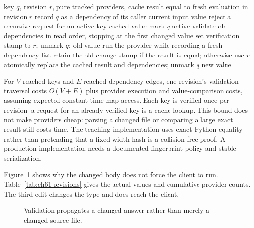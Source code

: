 \begin{algorithm}[htbp]
\caption{Demand a query in the current immutable revision.}
\label{alg:ch61-query}
\begin{pseudocode}
\Require key $q$, revision $r$, pure tracked providers, cache
\Ensure result equal to fresh evaluation in revision $r$
\State record $q$ as a dependency of its caller
  \State \Return current input value
\EndIf
\State reject a recursive request for an active key
  \State \Return cached value
\EndIf
\State mark $q$ active
  \State validate old dependencies in read order, stopping at the first changed value
    \State set verification stamp to $r$; unmark $q$; \Return old value
  \EndIf
\EndIf
\State run the provider while recording a fresh dependency list
\State retain the old change stamp if the result is equal; otherwise use $r$
\State atomically replace the cached result and dependencies; unmark $q$
\State \Return new value
\end{pseudocode}
\end{algorithm}

For $V$ reached keys and $E$ reached dependency edges, one revision's validation traversal costs $O(V+E)$ plus provider execution and value-comparison costs, assuming expected constant-time map access.
Each key is verified once per revision; a request for an already verified key is a cache lookup.
This bound does not make providers cheap: parsing a changed file or comparing a large exact result still costs time.
The teaching implementation uses exact Python equality rather than pretending that a fixed-width hash is a collision-free proof.
A production implementation needs a documented fingerprint policy and stable serialization.

Figure~\ref{fig:ch61-cutoff} shows why the changed body does not force the client to run.
Table~\ref{tab:ch61-revisions} gives the actual values and cumulative provider counts.
The third edit changes the type and does reach the client.

\begin{figure}[htbp]
\centering
{}
\caption{Validation propagates a changed answer rather than merely a changed source file.}
\label{fig:ch61-cutoff}
\end{figure}

